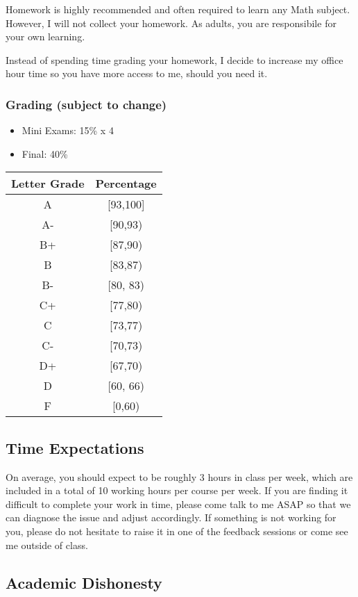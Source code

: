 \documentclass[
]{article}
\providecommand{\tightlist}{%
  \setlength{\itemsep}{0pt}\setlength{\parskip}{0pt}}
\begin{document}
Homework is highly recommended and often required to learn any Math
subject. However, I will not collect your homework.
As adults, you are responsibile for your own learning.

Instead of spending time grading your homework, I decide to
increase my office hour time so you have more access to me,
should you need it.

\hypertarget{grading-subject-to-change}{%
\subsubsection*{Grading (subject to change)}\label{grading-subject-to-change}}

\begin{itemize}
\tightlist
\item
  Mini Exams: 15\% x 4
\item
  Final: 40\%
\end{itemize}

\begin{longtable}[]{@{}cc@{}}
\toprule
\textbf{Letter Grade} & \textbf{Percentage}\tabularnewline
\midrule
\endhead
A & {[}93,100{]}\tabularnewline
A- & {[}90,93)\tabularnewline
B+ & {[}87,90)\tabularnewline
B & {[}83,87)\tabularnewline
B- & {[}80, 83)\tabularnewline
C+ & {[}77,80)\tabularnewline
C & {[}73,77)\tabularnewline
C- & {[}70,73)\tabularnewline
D+ & {[}67,70)\tabularnewline
D & {[}60, 66)\tabularnewline
F & {[}0,60)\tabularnewline
\bottomrule
\end{longtable}

\hypertarget{time-expectations}{%
\subsection*{Time Expectations}\label{time-expectations}}

On average, you should expect to be roughly 3 hours in class per week, which are included in a total of 10 working hours per course per week. If you are finding it difficult to complete your work in time, please come talk to me ASAP so that we can diagnose the issue and adjust accordingly. If something is not working for you, please do not hesitate to raise it in one of the feedback sessions or come see me outside of class.

\hypertarget{academic-dishonesty}{%
\subsection*{Academic Dishonesty}\label{academic-dishonesty}}
\end{document}
